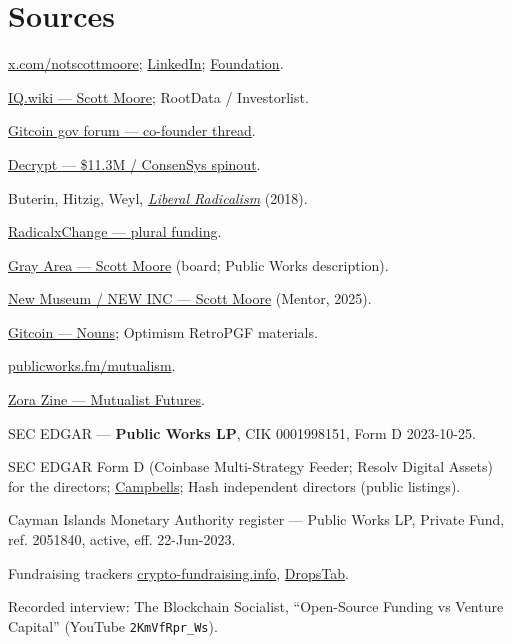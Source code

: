 \documentclass[11pt]{article}
\begin{document}
\section{Sources}
{\footnotesize
\begin{enumerate}[leftmargin=1.5em, itemsep=0.1em, label={[\arabic*]}]
\item \href{https://x.com/notscottmoore}{x.com/notscottmoore};
\href{https://www.linkedin.com/in/notscottmoore/}{LinkedIn};
\href{https://foundation.app/@notscottmoore}{Foundation}.
\item \href{https://iq.wiki/wiki/scott-moore}{IQ.wiki — Scott Moore}; RootData / Investorlist.
\item \href{https://gov.gitcoin.co/t/knowledge-transfer-who-is-a-cofounder-of-gitcoin/11371}{Gitcoin gov forum — co-founder thread}.
\item \href{https://decrypt.co/66541/ethereum-gitcoin-raises-11-million-spins-out-consensys}{Decrypt — \$11.3M / ConsenSys spinout}.
\item Buterin, Hitzig, Weyl, \href{https://papers.ssrn.com/sol3/papers.cfm?abstract_id=3243656}{\textit{Liberal Radicalism}} (2018).
\item \href{https://www.radicalxchange.org/wiki/plural-funding/}{RadicalxChange — plural funding}.
\item \href{https://grayarea.org/community-entry/scott-moore/}{Gray Area — Scott Moore} (board; Public Works description).
\item \href{https://www.newmuseum.org/person/scott-moore/}{New Museum / NEW INC — Scott Moore} (Mentor, 2025).
\item \href{https://www.gitcoin.co/blog/nouns-case-study}{Gitcoin — Nouns}; Optimism RetroPGF materials.
\item \href{https://www.publicworks.fm/mutualism}{publicworks.fm/mutualism}.
\item \href{https://zine.zora.co/scott-moore-gitcoin}{Zora Zine — Mutualist Futures}.
\item SEC EDGAR — \textbf{Public Works LP}, CIK 0001998151, Form D 2023-10-25.
\item SEC EDGAR Form D (Coinbase Multi-Strategy Feeder; Resolv Digital Assets) for the directors; \href{https://www.campbellslegal.com/contact/cayman-islands/}{Campbells}; Hash independent directors (public listings).
\item Cayman Islands Monetary Authority register — Public Works LP, Private Fund, ref. 2051840, active, eff. 22-Jun-2023.
\item Fundraising trackers \href{https://crypto-fundraising.info/funds/scott-moore/}{crypto-fundraising.info}, \href{https://dropstab.com/investors/scott-moore/portfolio}{DropsTab}.
\item Recorded interview: The Blockchain Socialist, ``Open-Source Funding vs Venture Capital'' (YouTube \texttt{2KmVfRpr\_Ws}).
\end{enumerate}}
\end{document}
